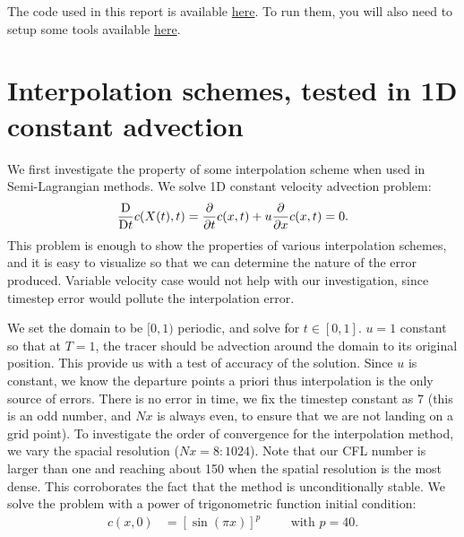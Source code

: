 \documentclass[11pt,letterpaper]{article}
\begin{document}
The code used in this report is available \href{https://gitfront.io/r/ryansjdu/28f425abdfa7e44aff8ed6258556c272cf10d3ea/CompPDEs-FinalProj/}{here}. To run them, you will also need to setup some tools available \href{https://github.com/Empyreal092/MATLAB_Tool}{here}. 

\section{Interpolation schemes, tested in 1D constant advection}\label{sec:interp1D}
We first investigate the property of some interpolation scheme when used in Semi-Lagrangian methods. We solve 1D constant velocity advection problem: 
\begin{align*}
        \frac{\mathrm{D}}{\mathrm{D} t}c(X(t),t) = \frac{\partial}{\partial t}c(x,t)+ u \frac{\partial}{\partial x}c(x,t) = 0.
\end{align*}
This problem is enough to show the properties of various interpolation schemes, and it is easy to visualize so that we can determine the nature of the error produced. Variable velocity case would not help with our investigation, since timestep error would pollute the interpolation error. %

We set the domain to be $[0,1)$ periodic, and solve for $t\in [0,1]$. $u = 1$ constant so that at $T = 1$, the tracer should be advection around the domain to its original position. This provide us with a test of accuracy of the solution. Since $u$ is constant, we know the departure points a priori thus interpolation is the only source of errors. There is no error in time, we fix the timestep constant as 7 (this is an odd number, and $Nx$ is always even, to ensure that we are not landing on a grid point). To investigate the order of convergence for the interpolation method, we vary the spacial resolution ($Nx = 8:1024$). Note that our CFL number is larger than one and reaching about 150 when the spatial resolution is the most dense. This corroborates the fact that the \sml\;method is unconditionally stable. We solve the problem with a power of trigonometric function initial condition:
\begin{align*}
    c(x,0) &= [\sin(\pi x)]^p \hspace{1cm}\text{with }p = 40.
\end{align*}
\end{document}
